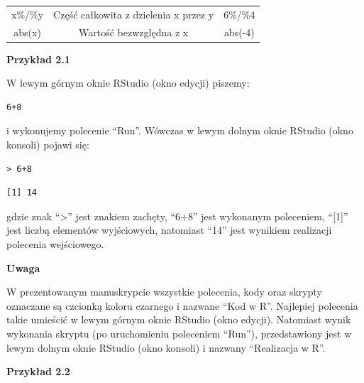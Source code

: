 \documentclass[12pt,B5paper,]{book}
\begin{document}
\begin{table}[!ht]
\begin{tabular}{ccc}
x\%/\%y                                                                                       & Część całkowita z dzielenia x przez y                                                                                                                                               & 6\%/\%4                                                         \\
abs(x)                                                                                        & Wartość bezwzględna z x                                                                                                                                                             & abs(-4)                                                         \\ \hline                                                           
\end{tabular}
\end{table}

\textbf{Przykład 2.1}

W lewym górnym oknie RStudio (okno edycji) piszemy:

\begin{verbatim}
6+8 
\end{verbatim}

i wykonujemy polecenie ``Run''. Wówczas w lewym dolnym oknie RStudio
(okno konsoli) pojawi się:

\begin{verbatim}
> 6+8 
\end{verbatim}

\begin{verbatim}
[1] 14
\end{verbatim}

gdzie znak ``\textgreater{}'' jest znakiem zachęty, ``6+8'' jest
wykonanym poleceniem, ``{[}1{]}'' jest liczbą elementów wyjściowych,
natomiast ``14'' jest wynikiem realizacji polecenia wejściowego.

\textbf{Uwaga}

W prezentowanym manuskrypcie wszystkie polecenia, kody oraz skrypty
oznaczane są czcionką koloru czarnego i nazwane ``Kod w R''. Najlepiej
polecenia takie umieścić w lewym górnym oknie RStudio (okno edycji).
Natomiast wynik wykonania skryptu (po uruchomieniu poleceniem ``Run''),
przedstawiony jest w lewym dolnym oknie RStudio (okno konsoli) i nazwany
``Realizacja w R''.

\vspace{0.8cm}

\textbf{Przykład 2.2}
\end{document}
